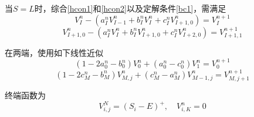 \documentclass{ctexart} %
\begin{document}
当$S=L$时，综合\eqref{hcon1}和\eqref{hcon2}以及定解条件\eqref{bc1}，需满足
\begin{equation}
V^n_{I}-(a^n_IV^{n}_{I-1}+b^n_IV^{n}_{I}+c^n_IV^{n}_{I+1,0})=V^{n+1}_{I}
\end{equation}
\begin{equation}
V^{n}_{I+1,0}-(a^n_IV^{n}_{I}+b^n_IV^{n}_{I+1,0}+c^n_IV^{n}_{I+2,0})=V^{n+1}_{I+1,1}
\end{equation}

在两端，使用如下线性近似
\begin{equation}
(1-2a^n_0-b^n_0)V^n_0+(a^n_0-c^n_0)V^{n}_{1}=V^{n+1}_0
\end{equation}
\begin{equation}
(1-2c^n_M-b^n_M)V^n_{M,j}+(c^n_M-a^n_M)V^{n}_{M-1,j}=V^{n+1}_{M,j+1}
\end{equation}

终端函数为
\begin{equation}
\label{hb}
V_{i,j}^N=(S_i-E)^+,\quad V_{i,K}^n=0
\end{equation}
\end{document}
